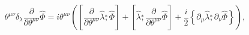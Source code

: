 \begin{equation}
\theta^{\mu\nu}\delta_\lambda \frac{\partial}{\partial\theta^{\mu\nu}}\widehat\Phi=
i\theta^{\mu\nu}\left(\left[\frac{\partial}{\partial\theta^{\mu\nu}}\widehat\lambda
\stackrel{\ast}{,}\widehat\Phi\right]+
\left[\widehat\lambda
\stackrel{\ast}{,}\frac{\partial}{\partial\theta^{\mu\nu}}\widehat\Phi\right]+
\frac{i}{2}\left\{\partial_\mu\widehat\lambda\stackrel{\ast}{,}\partial_\nu\widehat\Phi\right\}
\right),\label{horder2}
\end{equation}

